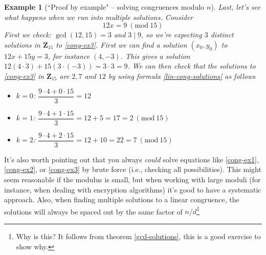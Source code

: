 \documentclass[12pt]{article}
\numberwithin{equation}{subsection}
\theoremstyle{note}
\newtheorem{example}[subsection]{Example}
\newtheorem{remark}[subsection]{Remark}
\newcommand{\Mod}[1]{\ (\mathrm{mod}\ #1)}
\begin{document}
\begin{example}[``Proof by example" -- solving congruences modulo $n$]
Last, let's see what happens when we run into multiple solutions. Consider \begin{equation} \label{cong-ex3} 12x=9\Mod{15}\end{equation} First we check: $\gcd(12,15)=3$ and $3\mid 9$, so we're expecting $3$ distinct solutions in $\mathbf{Z}_{15}$ to \eqref{cong-ex3}. First we can find a solution $(x_0,y_0)$ to $12x+15y=3$, for instance $(4,-3)$. This gives a solution $12(4\cdot 3)+15(3\cdot (-3))=3\cdot 3=9$. We can then check that the solutions to \eqref{cong-ex3} in $\mathbf{Z}_{15}$ are $2,7$ and $12$ by using formula \eqref{lin-cong-solutions} as follows  \begin{itemize} 
	\item $k=0$: $\dfrac{9\cdot 4+0\cdot 15}{3}=12$
	 \item $k=1$: $\dfrac{9\cdot 4+1\cdot15}{3}=12+5=17=2\Mod{15}$
	 \item $k=2$: $\dfrac{9\cdot 4+2\cdot15}{3}=12+10=22=7\Mod{15}$
	 \end{itemize} 
\end{example}

It's also worth pointing out that you always \textit{could} solve equations like \eqref{cong-ex1}, \eqref{cong-ex2}, or \eqref{cong-ex3} by brute force (i.e., checking all possibilities). This might seem reasonable if the modulus is small, but when working with large moduli (for instance, when dealing with encryption algorithms) it's good to have a systematic approach. Also, when finding multiple solutions to a linear congruence, the solutions will always be spaced out by the same factor of $n/d$\footnote{Why is this? It follows from theorem \ref{gcd-solutions}, this is a good exercise to show why.}


\end{document}
